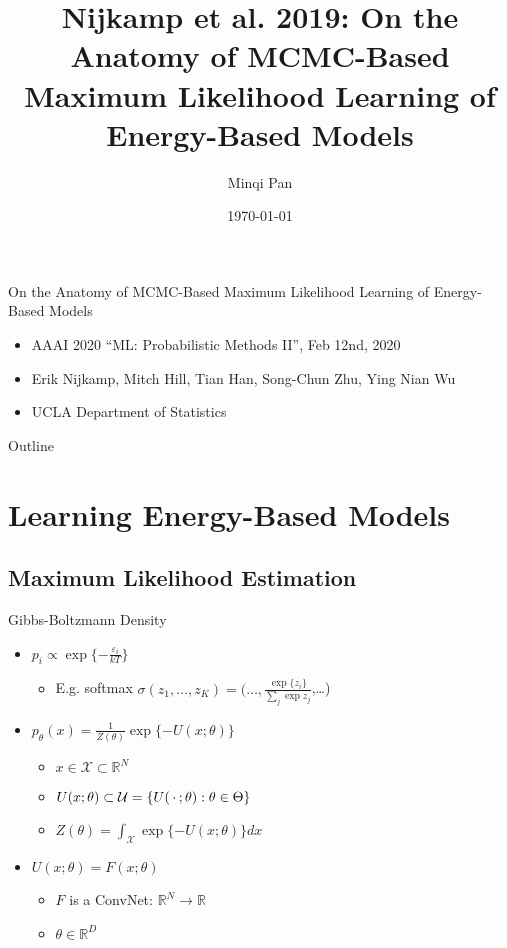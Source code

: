 \documentclass{beamer}
\title[Nijkamp et al. 2019: Anatomy of MCMC-based MLL of EBM]{Nijkamp et al. 2019: On the Anatomy of MCMC-Based Maximum Likelihood Learning of Energy-Based Models}
\author{Minqi Pan}
\date{\today}
\newcommand*{\Z}{\makebox[1.5ex]{\textbf{$\cdot$}}}
\begin{document}
\begin{frame}
  \titlepage
\end{frame}

\begin{frame}{On the Anatomy of MCMC-Based Maximum Likelihood Learning of Energy-Based Models}
\begin{itemize}
\item AAAI 2020 ``ML: Probabilistic Methods II'', Feb 12nd, 2020
\item Erik Nijkamp, Mitch Hill, Tian Han, Song-Chun Zhu, Ying Nian Wu
\item UCLA Department of Statistics
\end{itemize}
\end{frame}

\begin{frame}{Outline}
  \tableofcontents
\end{frame}

\section{Learning Energy-Based Models}
\subsection{Maximum Likelihood Estimation}
\begin{frame}{Gibbs-Boltzmann Density}
\begin{itemize}
\item $p_i\propto\exp\{-\frac{\varepsilon_i}{kT}\}$
\begin{itemize}
\item E.g. softmax $\sigma(z_1,\dots,z_K)=(\dots,\frac{\exp\{z_i\}}{\sum_j\exp{z_j}}$,\dots)
\end{itemize}
\item $p_\theta(x)=\frac{1}{Z(\theta)}\exp\{-U(x;\theta)\}$
\begin{itemize}
\item $x\in\mathcal{X}\subset\mathbb{R}^N$
\item $U(x;\theta)\subset\mathcal{U}=\{U(\Z;\theta):\theta\in\Theta\}$
\item $Z(\theta)=\int_\mathcal{X}\exp\{-U(x;\theta)\}dx$
\end{itemize}
\item $U(x;\theta)=F(x;\theta)$
\begin{itemize}
\item $F$ is a ConvNet: $\mathbb{R}^N\to\mathbb{R}$
\item $\theta\in\mathbb{R}^D$
\end{itemize}
\end{itemize}
\end{frame}
\end{document}
